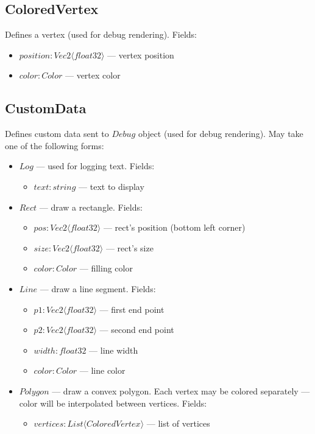 \subsection{ColoredVertex}
Defines a vertex (used for debug rendering). Fields:
\begin{itemize}
    \item $position : Vec2 \langle float32 \rangle$ --- vertex position
    \item $color : Color$ --- vertex color
\end{itemize}

\subsection{CustomData}
Defines custom data sent to $Debug$ object (used for debug rendering).
May take one of the following forms:
\begin{itemize}
    \item $Log$ --- used for logging text. Fields:
        \begin{itemize}
            \item $text : string$ --- text to display
        \end{itemize}
    \item $Rect$ --- draw a rectangle. Fields:
        \begin{itemize}
            \item $pos : Vec2 \langle float32 \rangle$ --- rect's position (bottom left corner)
            \item $size : Vec2 \langle float32 \rangle$ --- rect's size
            \item $color : Color$ --- filling color
        \end{itemize}
    \item $Line$ --- draw a line segment. Fields:
        \begin{itemize}
            \item $p1 : Vec2 \langle float32 \rangle$ --- first end point
            \item $p2 : Vec2 \langle float32 \rangle$ --- second end point
            \item $width : float32$ --- line width
            \item $color : Color$ --- line color
        \end{itemize}
    \item $Polygon$ --- draw a convex polygon.
        Each vertex may be colored separately --- color will be interpolated between vertices. Fields:
        \begin{itemize}
            \item $vertices : List \langle ColoredVertex \rangle$ --- list of vertices
        \end{itemize}
\end{itemize}

